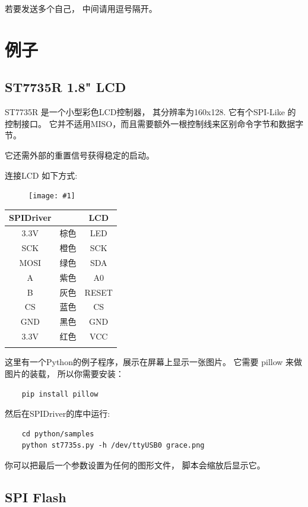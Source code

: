 \documentclass{article}
\newcommand{\pngw}[2]{
\begin{figure}[H]
\begin{center}
\texttt{[image: \#1]}
\end{center}
\end{figure}
}
\newcommand{\gap}{\vspace{10pt}}
\begin{document}
若要发送多个自己， 中间请用逗号隔开。 


\section{例子}
\subsection{ST7735R 1.8" LCD}

ST7735R 是一个小型彩色LCD控制器， 其分辨率为160x128. 
它有个SPI-Like 的控制接口。 它并不适用MISO，而且需要额外一根控制线来区别命令字节和数据字节。 

它还需外部的重置信号获得稳定的启动。 


连接LCD 如下方式:

\pngw{img/spidriver/spidriver-lcd-1}{0.5}

\begin{center}
\gap\begin{tabular}{ccc}
\hline
SPIDriver&        & LCD     \\
\hline
3.3V     & 棕色 & LED     \\
SCK      & 橙色 & SCK     \\
MOSI     & 绿色  & SDA     \\
A        & 紫色 & A0      \\
B        & 灰色   & RESET   \\
CS       & 蓝色   & CS      \\
GND      & 黑色  & GND     \\
3.3V     & 红色    & VCC     \\
\hline \\
\end{tabular}
\end{center}

这里有一个Python的例子程序，展示在屏幕上显示一张图片。 
它需要 pillow 来做图片的装载， 所以你需要安装： 
\begin{lstlisting}
    pip install pillow
\end{lstlisting}

然后在SPIDriver的库中运行:

\begin{lstlisting}
    cd python/samples
    python st7735s.py -h /dev/ttyUSB0 grace.png
\end{lstlisting}

你可以把最后一个参数设置为任何的图形文件， 
脚本会缩放后显示它。 

\subsection{SPI Flash}
\end{document}
